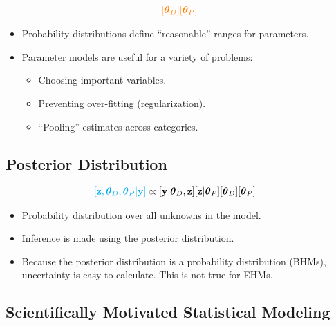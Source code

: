 \documentclass[]{book}
\begin{document}
\begin{align*}
\color{orange}{[\boldsymbol{\theta}_D] [\boldsymbol{\theta}_P]}
\end{align*}

\begin{itemize}
\item
  Probability distributions define ``reasonable'' ranges for parameters.
\item
  Parameter models are useful for a variety of problems:

  \begin{itemize}
  \item
    Choosing important variables.
  \item
    Preventing over-fitting (regularization).
  \item
    ``Pooling'' estimates across categories.
  \end{itemize}
\end{itemize}

\hypertarget{posterior-distribution}{%
\subsection{Posterior Distribution}\label{posterior-distribution}}

\begin{align*}
\color{cyan}{[\mathbf{z}, \boldsymbol{\theta}_D, \boldsymbol{\theta}_P | \mathbf{y}]} & \propto
[\mathbf{y} | \boldsymbol{\theta}_D, \mathbf{z}] [\mathbf{z} | \boldsymbol{\theta}_P] [\boldsymbol{\theta}_D] [\boldsymbol{\theta}_P]
\end{align*}

\begin{itemize}
\item
  Probability distribution over all unknowns in the model.
\item
  Inference is made using the posterior distribution.
\item
  Because the posterior distribution is a probability distribution (BHMs), uncertainty is easy to calculate. This is not true for EHMs.
\end{itemize}

\hypertarget{scientifically-motivated-statistical-modeling}{%
\subsection{Scientifically Motivated Statistical Modeling}\label{scientifically-motivated-statistical-modeling}}
\end{document}
